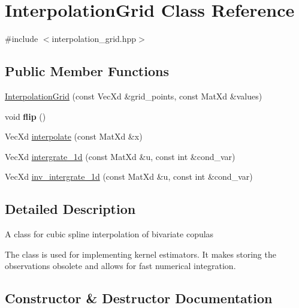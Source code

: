 \hypertarget{class_interpolation_grid}{}\section{Interpolation\+Grid Class Reference}
\label{class_interpolation_grid}


{\ttfamily \#include $<$interpolation\+\_\+grid.\+hpp$>$}

\subsection*{Public Member Functions}
\begin{DoxyCompactItemize}
\item 
\hyperlink{class_interpolation_grid_aed2639844689b97483d665feb5d0d0f7}{Interpolation\+Grid} (const Vec\+Xd \&grid\+\_\+points, const Mat\+Xd \&values)
\item 
void {\bfseries flip} ()\hypertarget{class_interpolation_grid_a07cca3a1e214f98fc9bafa2a6379f789}{}\label{class_interpolation_grid_a07cca3a1e214f98fc9bafa2a6379f789}

\item 
Vec\+Xd \hyperlink{class_interpolation_grid_a9e65596940b5e561ef6332d2559feb57}{interpolate} (const Mat\+Xd \&x)
\item 
Vec\+Xd \hyperlink{class_interpolation_grid_a90af7bd3f2646109be939fc48b2284ca}{intergrate\+\_\+1d} (const Mat\+Xd \&u, const int \&cond\+\_\+var)
\item 
Vec\+Xd \hyperlink{class_interpolation_grid_aba233f98f869c2aeff0d920a1dd477d6}{inv\+\_\+intergrate\+\_\+1d} (const Mat\+Xd \&u, const int \&cond\+\_\+var)
\end{DoxyCompactItemize}


\subsection{Detailed Description}
A class for cubic spline interpolation of bivariate copulas

The class is used for implementing kernel estimators. It makes storing the observations obsolete and allows for fast numerical integration. 

\subsection{Constructor \& Destructor Documentation}
